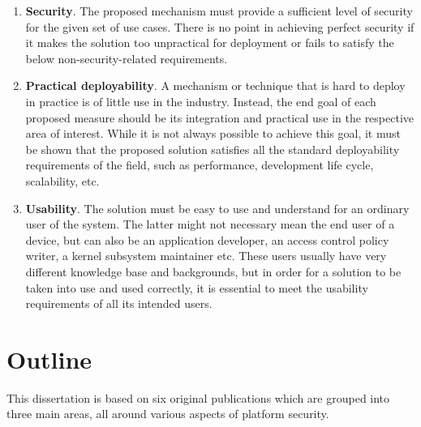\begin{enumerate}
	\item \textbf{Security}. The proposed mechanism must provide a sufficient level of security for the given set of use cases. There is no point in achieving perfect security if it makes the solution too unpractical for deployment or fails to satisfy the below non-security-related requirements.      
	\item \textbf{Practical deployability}. A mechanism or technique that is hard to deploy in practice is of little use in the industry. Instead, the end goal of each proposed measure should be its integration and practical use in the respective area of interest. While it is not always possible to achieve this goal, it must be shown that the proposed solution satisfies all the standard deployability requirements of the field, such as performance, development life cycle, scalability, etc.  
	\item \textbf{Usability}.	The solution must be easy to use and understand for an ordinary user of the system. The latter might not necessary mean the end user of a device, but can also be an application developer, an access control policy writer, a kernel subsystem maintainer etc. These users usually have very different knowledge base and backgrounds, but in order for a solution to be taken into use and used correctly, it is essential to meet the usability requirements of all its intended users. 
\end{enumerate}

\section{Outline}

This dissertation is based on six original publications which are grouped into three main areas, all around various aspects of platform security. 

